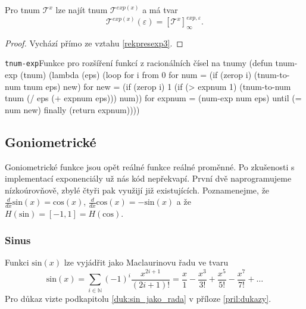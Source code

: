 \begin{consequence}\label{dusl:expotnumu}
Pro tnum $\mathcal{T}^x$ lze najít tnum $\mathcal{T}^{exp(x)}$ a má tvar
\begin{equation}
\mathcal{T}^{exp(x)}(\varepsilon)=\left[\mathcal{T}^x\right]_\infty^{exp,\varepsilon}.
\end{equation}
\begin{proof}
Vychází přímo ze vztahu \ref{rekpresexp3}.
\end{proof}
\end{consequence}

\begin{lispcode}{\texttt{tnum-exp}}{Funkce pro rozšíření funkcí z racionálních čísel na tnumy}
(\textcolor{funkcionalni}{defun} \textcolor{pojmenovan}{tnum-exp} (tnum)
  (\textcolor{funkcionalni}{lambda} (eps)
      (\textcolor{funkcionalni}{loop} \textcolor{obarvi}{for} i \textcolor{obarvi}{from} 0
        \textcolor{obarvi}{for} num = (\textcolor{funkcionalni}{if} (\textcolor{funkcionalni}{zerop} i) (\textcolor{moje}{tnum-to-num} tnum eps) new)
        \textcolor{obarvi}{for} new = (\textcolor{funkcionalni}{if} (\textcolor{funkcionalni}{zerop} i) 1 (\textcolor{funkcionalni}{if} (\textcolor{matematicke}{>} expnum 1) 
          (\textcolor{moje}{tnum-to-num} tnum (\textcolor{matematicke}{/} eps (\textcolor{matematicke}{+} expnum eps))) num))
        \textcolor{obarvi}{for} expnum = (\textcolor{moje}{num-exp} num eps)
        \textcolor{obarvi}{until} (\textcolor{matematicke}{=} num new)
        \textcolor{obarvi}{finally} (\textcolor{funkcionalni}{return} expnum))))
\end{lispcode}

\subsection{Goniometrické}
Goniometrické funkce jsou opět reálné funkce reálné proměnné. Po zkušenosti s implementací exponenciály už nás kód nepřekvapí. První dvě naprogramujeme nízkoúrovňově, zbylé čtyři pak využijí již existujících. Poznamenejme, že $\frac{d}{dx}\mathrm{sin}(x) = \mathrm{cos}(x)$, $\frac{d}{dx}\mathrm{cos}(x) = -\mathrm{sin}(x)$ a že $H(\mathrm{sin}) = [-1,1] = H(\mathrm{cos})$.

\subsubsection{Sinus}
\begin{fact}\label{vet:sin_jako_rada}
Funkci $\mathrm{sin}(x)$ lze vyjádřit jako Maclaurinovu řadu ve tvaru
\begin{equation}
\mathrm{sin}(x) =\sum_{i \in \mathbb{N}} (-1)^i \frac{x^{2i+1}}{(2i+1)!} =\frac{x}{1} - \frac{x^3}{3!} + \frac{x^5}{5!} - \frac{x^7}{7!} + \ldots
\end{equation}
Pro důkaz vizte podkapitolu \ref{duk:sin_jako_rada} v příloze \ref{pril:dukazy}.
\end{fact}

